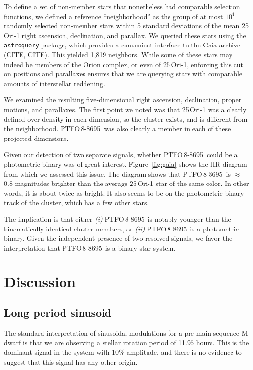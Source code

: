 \documentclass[12pt,twocolumn,tighten]{aastex62}
\newcommand{\ptfo}{PTFO$\,$8-8695}
\begin{document}
To define a set of non-member stars that nonetheless had comparable
selection functions, we defined a reference ``neighborhood'' as the
group of at most $10^4$ randomly selected non-member stars within 5
standard deviations of the mean 25$\,$Ori-1 right ascension,
declination, and parallax.  We queried these stars using the
\texttt{astroquery} package, which provides a convenient interface to
the Gaia archive (CITE, CITE).  This yielded 1{,}819 neighbors.  While
some of these stars may indeed be members of the Orion complex, or
even of 25$\,$Ori-1, enforcing this cut on positions and parallaxes
ensures that we are querying stars with comparable amounts of
interstellar reddening.

We examined the resulting five-dimensional right ascension,
declination, proper motions, and parallaxes.  The first point we noted
was that 25$\,$Ori-1 was a clearly defined over-density in each
dimension, so the cluster exists, and is different from the
neighborhood.  \ptfo\ was also clearly a member in each of these
projected dimensions.

Given our detection of two separate signals, whether \ptfo\ could be a
photometric binary was of great interest.  Figure~\ref{fig:gaia} shows
the HR diagram from which we assessed this issue.  The diagram shows
that \ptfo\ is $\approx$0.8 magnitudes brighter than the average
25$\,$Ori-1 star of the same color.  In other words, it is about twice
as bright.  It also seems to be on the photometric binary track of the
cluster, which has a few other stars.

The implication is that either {\it (i)} \ptfo\ is notably younger
than the kinematically identical cluster members, or {\it (ii)} \ptfo\
is a photometric binary.  Given the independent presence of two
resolved signals, we favor the interpretation that \ptfo\ is a binary
star system.


\section{Discussion}
\label{sec:discussion}

\subsection{Long period sinusoid}

The standard interpretation of sinusoidal modulations for a
pre-main-sequence M dwarf is that we are observing a stellar rotation
period of 11.96 hours.  This is the dominant signal in the system with
10\% amplitude, and there is no evidence to suggest that this signal
has any other origin.
\end{document}

